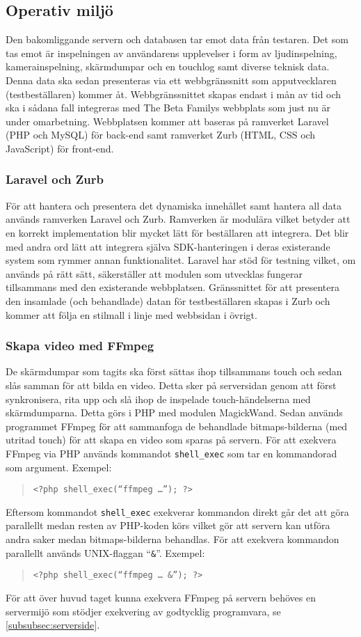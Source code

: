\subsection{Operativ miljö}
\label{subsec:environment}

Den bakomliggande servern och databasen tar emot data från testaren. Det som tas emot är inspelningen av användarens upplevelser i form av ljudinspelning, kamerainspelning, skärmdumpar och en touchlog samt diverse teknisk data. Denna data ska sedan presenteras via ett webbgränssnitt som apputvecklaren (testbeställaren) kommer åt. Webbgränssnittet skapas endast i mån av tid och ska i sådana fall integreras med The Beta Familys webbplats som just nu är under omarbetning. Webbplatsen kommer att baseras på ramverket Laravel (PHP och MySQL) för back-end samt ramverket Zurb (HTML, CSS och JavaScript) för front-end.

\subsubsection{Laravel och Zurb}
För att hantera och presentera det dynamiska innehållet samt hantera all data används ramverken Laravel och Zurb. Ramverken är modulära vilket betyder att en korrekt implementation blir mycket lätt för beställaren att integrera. Det blir med andra ord lätt att integrera själva SDK-hanteringen i deras existerande system som rymmer annan funktionalitet. Laravel har stöd för testning vilket, om används på rätt sätt, säkerställer att modulen som utvecklas fungerar tillsammans med den existerande webbplatsen. Gränssnittet för att presentera den insamlade (och behandlade) datan för testbeställaren skapas i Zurb och kommer att följa en stilmall i linje med webbsidan i övrigt.

\subsubsection{Skapa video med FFmpeg}
De skärmdumpar som tagits ska först sättas ihop tillsammans touch och sedan slås samman för att bilda en video. Detta sker på serversidan genom att först synkronisera, rita upp och slå ihop de inspelade touch-händelserna med skärmdumparna. Detta görs i PHP med modulen MagickWand\parencite{magickwand}. Sedan används programmet FFmpeg\parencite{ffmpeg} för att sammanfoga de behandlade bitmaps-bilderna (med utritad touch) för att skapa en video som sparas på servern. För att exekvera FFmpeg via PHP används kommandot \texttt{shell\_exec}\parencite{shellexec} som tar en kommandorad som argument. Exempel:
\begin{quote}
\texttt{<?php shell\_exec(``ffmpeg \dots''); ?>}
\end{quote}
Eftersom kommandot \texttt{shell\_exec} exekverar kommandon direkt går det att göra parallellt medan resten av PHP-koden körs vilket gör att servern kan utföra andra saker medan bitmaps-bilderna behandlas. För att exekvera kommandon parallellt används UNIX-flaggan ``\texttt{\&}''. Exempel:
\begin{quote}
\texttt{<?php shell\_exec(``ffmpeg \dots~\&''); ?>}
\end{quote}
För att över huvud taget kunna exekvera FFmpeg på servern behöves en servermijö som stödjer exekvering av godtycklig programvara, se \ref{subsubsec:serverside}.